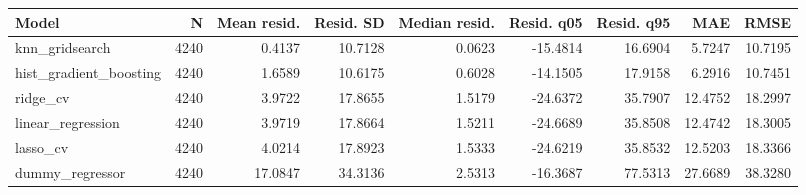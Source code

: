 \begin{tabular}{lrrrrrrrr}
\toprule
Model & N & Mean resid. & Resid. SD & Median resid. & Resid. q05 & Resid. q95 & MAE & RMSE \\
\midrule
knn\_gridsearch & 4240 & 0.4137 & 10.7128 & 0.0623 & -15.4814 & 16.6904 & 5.7247 & 10.7195 \\
hist\_gradient\_boosting & 4240 & 1.6589 & 10.6175 & 0.6028 & -14.1505 & 17.9158 & 6.2916 & 10.7451 \\
ridge\_cv & 4240 & 3.9722 & 17.8655 & 1.5179 & -24.6372 & 35.7907 & 12.4752 & 18.2997 \\
linear\_regression & 4240 & 3.9719 & 17.8664 & 1.5211 & -24.6689 & 35.8508 & 12.4742 & 18.3005 \\
lasso\_cv & 4240 & 4.0214 & 17.8923 & 1.5333 & -24.6219 & 35.8532 & 12.5203 & 18.3366 \\
dummy\_regressor & 4240 & 17.0847 & 34.3136 & 2.5313 & -16.3687 & 77.5313 & 27.6689 & 38.3280 \\
\bottomrule
\end{tabular}
